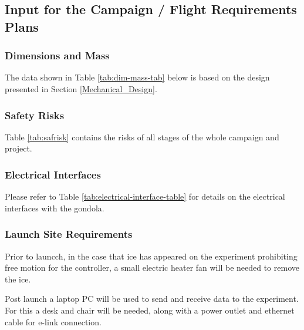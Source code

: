 \subsection{Input for the Campaign / Flight Requirements Plans}


\subsubsection{Dimensions and Mass}
\label{sec:dim-mass}

The data shown in Table \ref{tab:dim-mass-tab} below is based on the design presented in Section \ref{Mechanical_Design}. %



\subsubsection{Safety Risks}
Table \ref{tab:safrisk} contains the risks of all stages of the whole campaign and project.


\subsubsection{Electrical Interfaces}

Please refer to Table \ref{tab:electrical-interface-table} for details on the electrical interfaces with the gondola.



\subsubsection{Launch Site Requirements}
Prior to launcch, in the case that ice has appeared on the experiment prohibiting free motion for the controller, a small electric heater fan will be needed to remove the ice.

Post launch a laptop PC will be used to send and receive data to the experiment. For this a desk and chair will be needed, along with a power outlet and ethernet cable for e-link connection.


